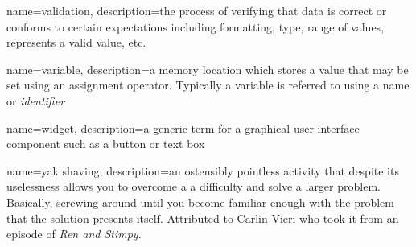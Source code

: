 {
  name=validation,
  description={the process of verifying that data is correct or conforms to certain expectations including formatting, type, range of values,
  	represents a valid value, etc.}
}

{
  name=variable,
  description={a memory location which stores a value that may be set using an assignment operator.  Typically a variable
  	is referred to using a name or \emph{identifier}}
}

{
  name=widget,
  description={a generic term for a graphical user interface component such as a button or text box}
}

{
  name=yak shaving,
  description={an ostensibly pointless activity that despite its uselessness allows you to overcome a a difficulty and solve a larger problem.  Basically, screwing around until you become familiar enough with the problem that the solution presents itself.  Attributed to Carlin Vieri who took it from an episode of \emph{Ren and Stimpy}.}
}















